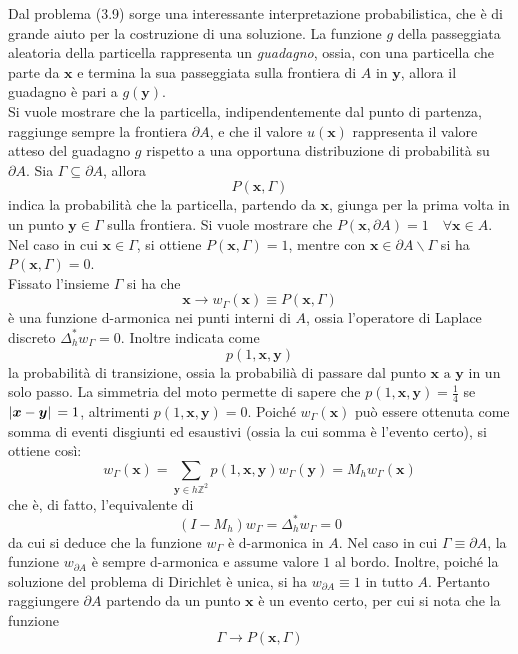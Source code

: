\documentclass[a4paper,12pt, draft]{article}
\theoremstyle{break}
\numberwithin{equation}{section}
\begin{document}
Dal problema (3.9) sorge una interessante interpretazione probabilistica, che è di grande aiuto per la costruzione di una soluzione. La funzione \(g\) della passeggiata aleatoria della particella rappresenta un \emph{guadagno}, ossia, con una particella che parte da \(\bm{x}\) e termina la sua passeggiata sulla frontiera di \(A\) in \(\bm{y}\), allora il guadagno è pari a \(g(\bm{y})\). \\
Si vuole mostrare che la particella, indipendentemente dal punto di partenza, raggiunge sempre la frontiera \(\partial A\), e che il valore \(u(\bm{x})\) rappresenta il valore atteso del guadagno \(g\) rispetto a una opportuna distribuzione di probabilità su \(\partial A\). Sia \(\Gamma \subseteq \partial A\), allora 
\[
  P(\bm{x}, \Gamma)
\]
indica la probabilità che la particella, partendo da \(\bm{x}\), giunga per la prima volta in un punto \(\bm{y} \in \Gamma\) sulla frontiera. Si vuole mostrare che \(P(\bm{x}, \partial A) = 1 \quad \forall \bm{x} \in A\).
Nel caso in cui \(\bm{x} \in \Gamma\), si ottiene \(P(\bm{x}, \Gamma) = 1\), mentre con \(\bm{x} \in \partial A\backslash \Gamma\) si ha \(P(\bm{x}, \Gamma) = 0\). \\
Fissato l'insieme \(\Gamma\) si ha che 
\[
  \bm{x} \longrightarrow w_{\Gamma}(\bm{x}) \equiv P(\bm{x}, \Gamma)
\]
è una funzione d-armonica nei punti interni di \(A\), ossia l'operatore di Laplace discreto \(\Delta^*_h w_{\Gamma} = 0\). Inoltre indicata come
\[
p(1, \bm{x}, \bm{y})  
\]     
la probabilità di transizione, ossia la probabilià di passare dal punto \(\bm{x} \mbox{ a } \bm{y}\) in un solo passo. La simmetria del moto permette di sapere che \(p(1, \bm{x}, \bm{y}) =  \frac{1}{4}\) se \(\abs*{\bm{x} -\bm{y}} = 1\), altrimenti \(p(1, \bm{x}, \bm{y}) = 0\). Poiché \(w_{\Gamma}(\bm{x})\) può essere ottenuta come somma di eventi disgiunti ed esaustivi (ossia la cui somma è l'evento certo), si ottiene così:
\[
  w_{\Gamma}(\bm{x}) = \sum_{\bm{y} \in h\mathbb{Z}^2}p(1, \bm{x}, \bm{y})w_{\Gamma}(\bm{y}) = M_hw_{\Gamma}(\bm{x})
\]
che è, di fatto, l'equivalente di 
\[
  (I - M_h)w_{\Gamma} = \Delta^*_h w_{\Gamma} = 0
\]
da cui si deduce che la funzione \(w_{\Gamma}\) è d-armonica in \(A\). Nel caso in cui \(\Gamma \equiv \partial A\), la funzione \(w_{\partial A}\) è sempre d-armonica e assume valore \(1\) al bordo. Inoltre, poiché la soluzione del problema di Dirichlet è unica, si ha \(w_{\partial A} \equiv 1\) in tutto \(A\). Pertanto raggiungere \(\partial A\) partendo da un punto \(\bm{x}\) è un evento certo, per cui si nota che la funzione 
\[
\Gamma \longrightarrow P(\bm{x}, \Gamma)  
\]
\end{document}
